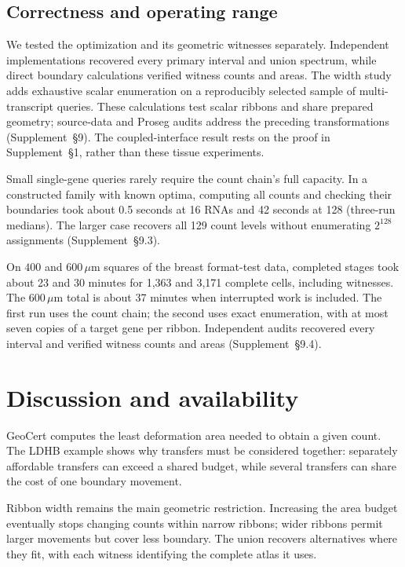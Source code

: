 \documentclass[10pt,letterpaper]{article}
\begin{document}
\subsection{Correctness and operating range}\label{sec:verification}
We tested the optimization and its geometric witnesses separately. Independent implementations recovered every primary interval and union spectrum, while direct boundary calculations verified witness counts and areas. The width study adds exhaustive scalar enumeration on a reproducibly selected sample of multi-transcript queries. These calculations test scalar ribbons and share prepared geometry; source-data and Proseg audits address the preceding transformations (Supplement~\S9). The coupled-interface result rests on the proof in Supplement~\S1, rather than these tissue experiments.

Small single-gene queries rarely require the count chain's full capacity. In a constructed family with known optima, computing all counts and checking their boundaries took about 0.5 seconds at 16 RNAs and 42 seconds at 128 (three-run medians). The larger case recovers all 129 count levels without enumerating $2^{128}$ assignments (Supplement~\S9.3).

On $400$ and $600\,\mu\mathrm m$ squares of the breast format-test data, completed stages took about 23 and 30 minutes for 1,363 and 3,171 complete cells, including witnesses. The $600\,\mu\mathrm m$ total is about 37 minutes when interrupted work is included. The first run uses the count chain; the second uses exact enumeration, with at most seven copies of a target gene per ribbon. Independent audits recovered every interval and verified witness counts and areas (Supplement~\S9.4).

\section{Discussion and availability}
GeoCert computes the least deformation area needed to obtain a given count. The LDHB example shows why transfers must be considered together: separately affordable transfers can exceed a shared budget, while several transfers can share the cost of one boundary movement.

Ribbon width remains the main geometric restriction. Increasing the area budget eventually stops changing counts within narrow ribbons; wider ribbons permit larger movements but cover less boundary. The union recovers alternatives where they fit, with each witness identifying the complete atlas it uses.
\end{document}
